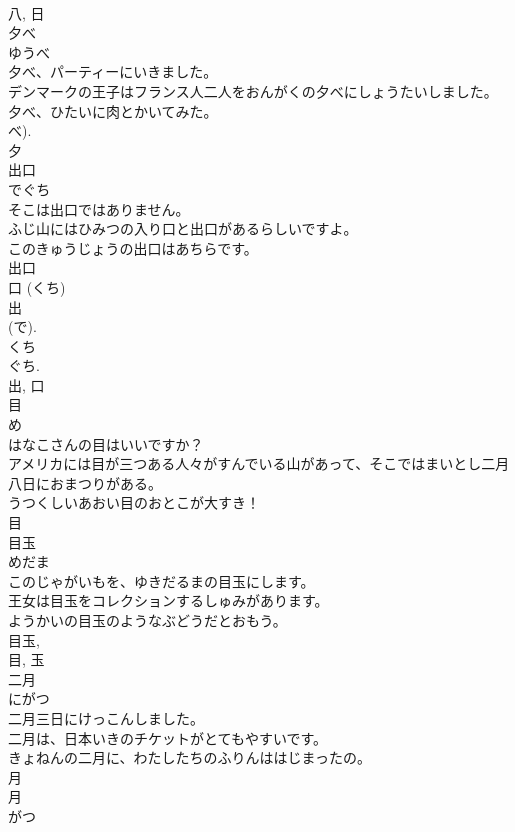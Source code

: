 \documentclass[8pt]{extreport}
\begin{document}
\begin{CJK}{UTF8}{min}
\\	八, 日	
\\	夕べ	
\\	ゆうべ	
\\	夕べ、パーティーにいきました。	
\\	デンマークの王子はフランス人二人をおんがくの夕べにしょうたいしました。	
\\	夕べ、ひたいに肉とかいてみた。	
\\	べ). 
\\	夕	
\\	出口	
\\	でぐち	
\\	そこは出口ではありません。	
\\	ふじ山にはひみつの入り口と出口があるらしいですよ。	
\\	このきゅうじょうの出口はあちらです。	
\\	出口 
\\	口 (くち) 
\\	出 
\\	(で). 
\\	くち 
\\	ぐち.
\\	出, 口	
\\	目	
\\	め	
\\	はなこさんの目はいいですか？	
\\	アメリカには目が三つある人々がすんでいる山があって、そこではまいとし二月八日におまつりがある。	
\\	うつくしいあおい目のおとこが大すき！	
\\	目	
\\	目玉	
\\	めだま	
\\	このじゃがいもを、ゆきだるまの目玉にします。	
\\	王女は目玉をコレクションするしゅみがあります。	
\\	ようかいの目玉のようなぶどうだとおもう。	
\\	目玉, 
\\	目, 玉	
\\	二月	
\\	にがつ	
\\	二月三日にけっこんしました。	
\\	二月は、日本いきのチケットがとてもやすいです。	
\\	きょねんの二月に、わたしたちのふりんははじまったの。	
\\	月 
\\	月 
\\	がつ 

\end{CJK}
\end{document}
